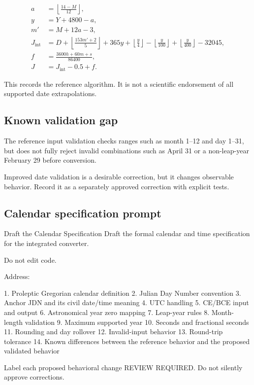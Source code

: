 \documentclass[11pt,letterpaper]{article}
\begin{document}
\begin{align*}
a &= \left\lfloor\frac{14-M}{12}\right\rfloor, \\
y &= Y + 4800 - a, \\
m' &= M + 12a - 3, \\
J_{\mathrm{int}} &= D + \left\lfloor\frac{153m'+2}{5}\right\rfloor
+ 365y + \left\lfloor\frac{y}{4}\right\rfloor
- \left\lfloor\frac{y}{100}\right\rfloor
+ \left\lfloor\frac{y}{400}\right\rfloor - 32045, \\
f &= \frac{3600h+60m+s}{86400}, \\
J &= J_{\mathrm{int}} - 0.5 + f.
\end{align*}

This records the reference algorithm. It is not a scientific endorsement of
all supported date extrapolations.

\subsection{Known validation gap}

The reference input validation checks ranges such as month 1--12 and day
1--31, but does not fully reject invalid combinations such as April 31 or a
non-leap-year February 29 before conversion.

\begin{warningbox}
Improved date validation is a desirable correction, but it changes observable
behavior. Record it as a separately approved correction with explicit tests.
\end{warningbox}

\subsection{Calendar specification prompt}

\begin{promptbox}{Draft the Calendar Specification}
Draft the formal calendar and time specification for the integrated
converter.

Do not edit code.

Address:

1. Proleptic Gregorian calendar definition
2. Julian Day Number convention
3. Anchor JDN and its civil date/time meaning
4. UTC handling
5. CE/BCE input and output
6. Astronomical year zero mapping
7. Leap-year rules
8. Month-length validation
9. Maximum supported year
10. Seconds and fractional seconds
11. Rounding and day rollover
12. Invalid-input behavior
13. Round-trip tolerance
14. Known differences between the reference behavior and the
    proposed validated behavior

Label each proposed behavioral change REVIEW REQUIRED.
Do not silently approve corrections.
\end{promptbox}
\end{document}
